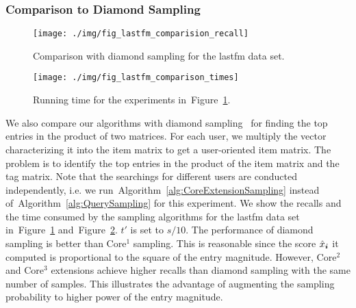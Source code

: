 \documentclass[letterpaper]{article}
\newcommand{\V}[1]{{\boldsymbol{{\MakeLowercase{#1}}}}}
\newcommand{\Fig}[1]{Figure~\ref{fig:#1}}
\newcommand{\Alg}[1]{Algorithm~\ref{alg:#1}}
\begin{document}
\subsubsection{Comparison to Diamond Sampling}
\begin{figure}[!ht]
  \centering
  \texttt{[image: ./img/fig\_lastfm\_comparision\_recall]}\\
  \caption{Comparison with diamond sampling for the lastfm data set.}
  \label{fig:Comparison_recall}
\end{figure}
\begin{figure}[!ht]
    \centering
    \texttt{[image: ./img/fig\_lastfm\_comparison\_times]}\\
    \caption{Running time for the experiments in~\Fig{Comparison_recall}.}
\label{fig:Comparison_time}
\end{figure}
We also compare our algorithms with diamond sampling~\cite{BaPiKoSe15} 
for finding the top entries in the product of two matrices. 
For each user, we multiply the vector characterizing it into the item matrix 
to get a user-oriented item matrix. 
The problem is to identify the top entries in the product of the item matrix and the tag matrix. 
Note that the searchings for different users are conducted independently,
i.e. we run~\Alg{CoreExtensionSampling} instead of~\Alg{QuerySampling} for this experiment.
We show the recalls and the time consumed by the sampling algorithms for the lastfm data set
in~\Fig{Comparison_recall} and~\Fig{Comparison_time}.
$t'$ is set to $s/10$. 
The performance of diamond sampling is better than Core$^1$ sampling.
This is reasonable since the score $\hat{x}_{\V{i}}$ it computed is proportional to the square of the entry magnitude. 
However, Core$^2$ and Core$^3$ extensions achieve higher recalls than diamond sampling with the same number of samples. 
This illustrates the advantage of augmenting the sampling probability to higher power of the entry magnitude.





\end{document}
